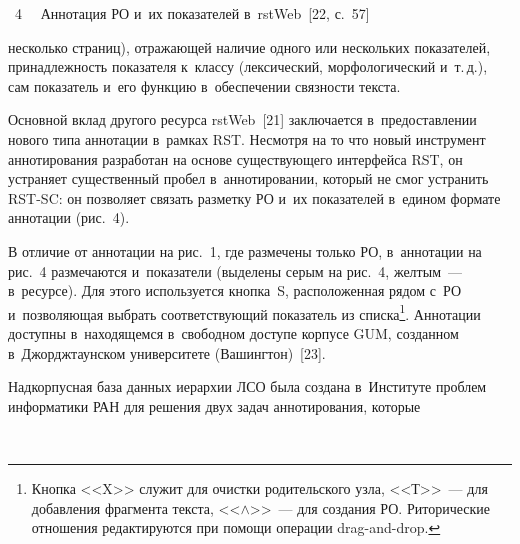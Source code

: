 \begin{multicols}{2}
{\noindent
{{\figurename~4}\ \ \small{
Аннотация РО и~их показателей в~rstWeb~[22, с.~57] 
}}}

\vspace*{6pt}

\noindent
 несколько страниц), 
отражающей наличие одного или нескольких показателей, при\-над\-леж\-ность 
показателя к~классу (лексический, морфологический
 и~т.\,д.), сам показатель и~его 
функцию в~обеспечении связ\-ности текста.



    Основной вклад другого ресурса rstWeb~[21] заключается в~предостав\-ле\-нии 
нового типа аннотации в~рамках RST. Несмотря на то что новый инструмент 
аннотирования разработан на основе существующего интерфейса RST, он 
устраняет существенный пробел в~аннотировании, который не смог устранить 
RST-SC: он позволяет связать разметку РО и~их показателей в~едином формате 
аннотации (рис.~4). 


    В отличие от аннотации на рис.~1, где размечены только РО, в~аннотации на 
рис.~4 размечаются и~показатели (выделены серым на рис.~4, желтым~--- 
в~ресурсе). Для этого используется кноп\-ка~S, расположенная рядом с~РО 
и~поз\-во\-ля\-ющая выбрать соответствующий показатель из списка\footnote[1]{Кнопка 
<<X>> служит для очистки родительского узла, <<Т>>~--- для добавления 
фрагмента текста, <<$\wedge$>>~--- для создания РО. Риторические отношения редактируются при 
помощи операции drag-and-drop.}. Аннотации до\-ступ\-ны в~находящемся 
в~свободном доступе корпусе GUM, соз\-дан\-ном в~Джорджтаунском университете 
(Вашингтон)~[23].

    Надкорпусная база данных иерархии ЛСО была создана в~Институте проблем информатики РАН для 
решения двух задач аннотирования, которые\linebreak\vspace*{-12pt}

\pagebreak

\end{multicols}

\setcounter{figure}{4}
\begin{figure*} %
\vspace*{1pt}
  \begin{center}  
    \mbox{%
\epsfxsize=149.61mm
}

\end{center}
\vspace*{-9pt}
\end{figure*}

